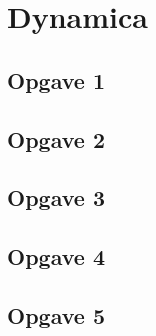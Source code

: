 \section{Dynamica}
\subsection{Opgave 1}
\subsection{Opgave 2}
\subsection{Opgave 3}
\subsection{Opgave 4}
\subsection{Opgave 5}